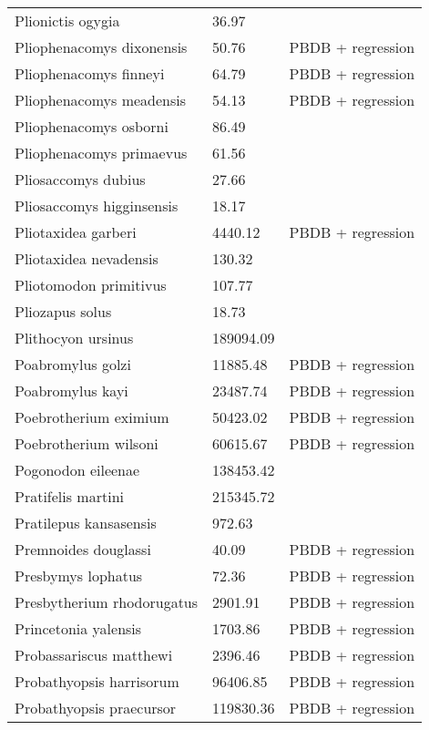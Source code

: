 \documentclass{article}
\begin{document}
\begin{center}
\begin{longtable}{p{} p{} p{}}
    Plionictis ogygia & 36.97 & \cite{Tomiya2013} \\ 
    Pliophenacomys dixonensis & 50.76 & PBDB + regression \\ 
    Pliophenacomys finneyi & 64.79 & PBDB + regression \\ 
    Pliophenacomys meadensis & 54.13 & PBDB + regression \\ 
    Pliophenacomys osborni & 86.49 & \cite{Tomiya2013} \\ 
    Pliophenacomys primaevus & 61.56 & \cite{Tomiya2013} \\ 
    Pliosaccomys dubius & 27.66 & \cite{Tomiya2013} \\ 
    Pliosaccomys higginsensis & 18.17 & \cite{Tomiya2013} \\ 
    Pliotaxidea garberi & 4440.12 & PBDB + regression \\ 
    Pliotaxidea nevadensis & 130.32 & \cite{Tomiya2013} \\ 
    Pliotomodon primitivus & 107.77 & \cite{Tomiya2013} \\ 
    Pliozapus solus & 18.73 & \cite{Tomiya2013} \\ 
    Plithocyon ursinus & 189094.09 & \cite{Tomiya2013} \\ 
    Poabromylus golzi & 11885.48 & PBDB + regression \\ 
    Poabromylus kayi & 23487.74 & PBDB + regression \\ 
    Poebrotherium eximium & 50423.02 & PBDB + regression \\ 
    Poebrotherium wilsoni & 60615.67 & PBDB + regression \\ 
    Pogonodon eileenae & 138453.42 & \cite{Fox2011b} \\ 
    Pratifelis martini & 215345.72 & \cite{Tomiya2013} \\ 
    Pratilepus kansasensis & 972.63 & \cite{Tomiya2013} \\ 
    Premnoides douglassi & 40.09 & PBDB + regression \\ 
    Presbymys lophatus & 72.36 & PBDB + regression \\ 
    Presbytherium rhodorugatus & 2901.91 & PBDB + regression \\ 
    Princetonia yalensis & 1703.86 & PBDB + regression \\ 
    Probassariscus matthewi & 2396.46 & PBDB + regression \\ 
    Probathyopsis harrisorum & 96406.85 & PBDB + regression \\ 
    Probathyopsis praecursor & 119830.36 & PBDB + regression \\ 

\end{longtable}
\end{center}
\end{document}
